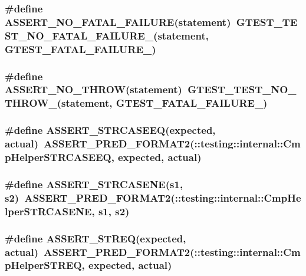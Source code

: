 \subsubsection{\setlength{\rightskip}{0pt plus 5cm}\#define ASSERT\_\-NO\_\-FATAL\_\-FAILURE(statement)~GTEST\_\-TEST\_\-NO\_\-FATAL\_\-FAILURE\_\-(statement, GTEST\_\-FATAL\_\-FAILURE\_\-)}\label{gtest_8h_b957ba33b4f4c2b1418ae88fc659982f}


\subsubsection{\setlength{\rightskip}{0pt plus 5cm}\#define ASSERT\_\-NO\_\-THROW(statement)~GTEST\_\-TEST\_\-NO\_\-THROW\_\-(statement, GTEST\_\-FATAL\_\-FAILURE\_\-)}\label{gtest_8h_847284796652b28fae5da442c1525c9a}


\subsubsection{\setlength{\rightskip}{0pt plus 5cm}\#define ASSERT\_\-STRCASEEQ(expected, actual)~ASSERT\_\-PRED\_\-FORMAT2(::testing::internal::CmpHelperSTRCASEEQ, expected, actual)}\label{gtest_8h_a5730f5d00d9fc0cc84ad1ed7a221beb}


\subsubsection{\setlength{\rightskip}{0pt plus 5cm}\#define ASSERT\_\-STRCASENE(s1, s2)~ASSERT\_\-PRED\_\-FORMAT2(::testing::internal::CmpHelperSTRCASENE, s1, s2)}\label{gtest_8h_90d237b56ead141b6a1f194d2500a129}


\subsubsection{\setlength{\rightskip}{0pt plus 5cm}\#define ASSERT\_\-STREQ(expected, actual)~ASSERT\_\-PRED\_\-FORMAT2(::testing::internal::CmpHelperSTREQ, expected, actual)}\label{gtest_8h_089f4a9f6397a8d03717b07c4ccf2704}


